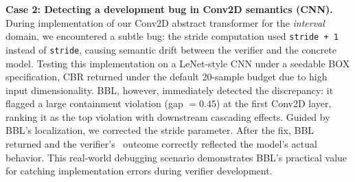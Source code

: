 \textbf{Case 2: Detecting a development bug in Conv2D semantics (CNN).}
During implementation of our Conv2D abstract transformer for the \textit{interval} domain, we encountered a subtle bug: the stride computation used \texttt{stride + 1} instead of \texttt{stride}, causing semantic drift between the verifier and the concrete model. Testing this implementation on a LeNet-style CNN under a seedable \textsf{BOX} specification, CBR returned \Inconclusive under the default 20-sample budget due to high input dimensionality. BBL, however, immediately detected the discrepancy: it flagged a large containment violation (gap $=0.45$) at the first Conv2D layer, ranking it as the top violation with downstream cascading effects. Guided by BBL's localization, we corrected the stride parameter. After the fix, BBL returned \Pass and the verifier's \Certified\ outcome correctly reflected the model's actual behavior. This real-world debugging scenario demonstrates BBL's practical value for catching implementation errors during verifier development.
